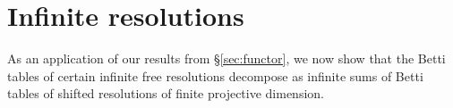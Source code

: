 \documentclass[12pt]{amsart}
\theoremstyle{definition}
\theoremstyle{remark}
\newcommand{\FF}{\mathbf{F}}
\begin{document}
\section{Infinite resolutions}\label{sec:infinite}
As an application of our results from \S\ref{sec:functor}, we now show that the Betti tables of certain infinite free resolutions decompose as infinite sums of Betti tables of shifted resolutions of finite projective dimension.
%
\end{document}
